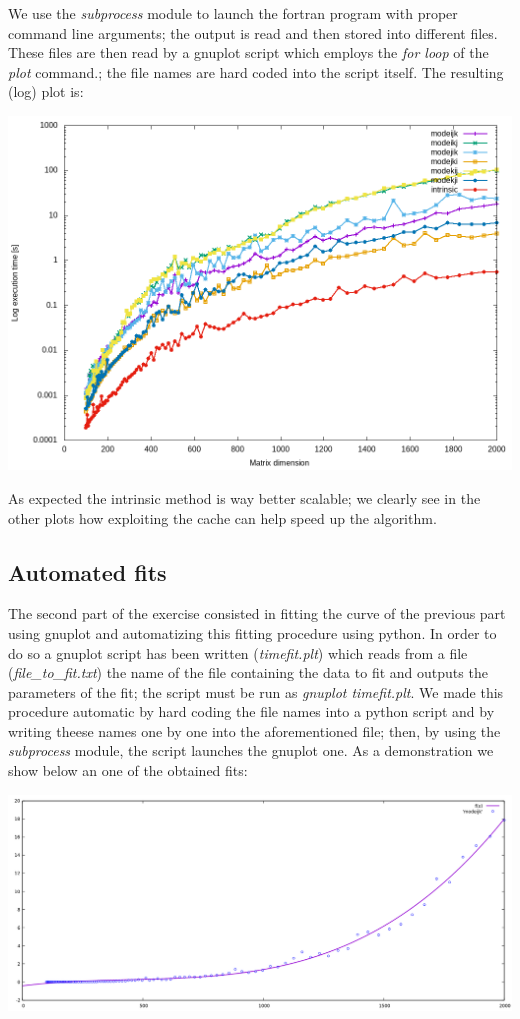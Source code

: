 \documentclass{article}
\begin{document}
We use the \textit{subprocess} module to launch the fortran program with proper command line arguments; the output is read and then stored into different files. These files are then read by a gnuplot script which employs the \textit{for loop} of the \textit{plot} command.; the file names are hard coded into the script itself. The resulting (log) plot is:
\begin{center}
	\includegraphics[width=0.65\linewidth]{time_plots.png}
\end{center}
As expected the intrinsic method is way better scalable; we clearly see in the other plots how exploiting the cache can help speed up the algorithm.
\subsection*{Automated fits}
The second part of the exercise consisted in fitting the curve of the previous part using gnuplot and automatizing this fitting procedure using python. In order to do so a gnuplot script has been written (\textit{timefit.plt}) which reads from a file (\textit{file\_to\_fit.txt}) the name of the file containing the data to fit and outputs the parameters of the fit; the script must be run as \textit{gnuplot timefit.plt}. We made this procedure automatic by hard coding the file names into a python script and by writing theese names one by one into the aforementioned file; then, by using the \textit{subprocess} module, the script launches the gnuplot one. As a demonstration we show below an one of the obtained fits:
\begin{center}
	\includegraphics[width=0.8\linewidth]{examplefit.png}
\end{center}
\end{document}
